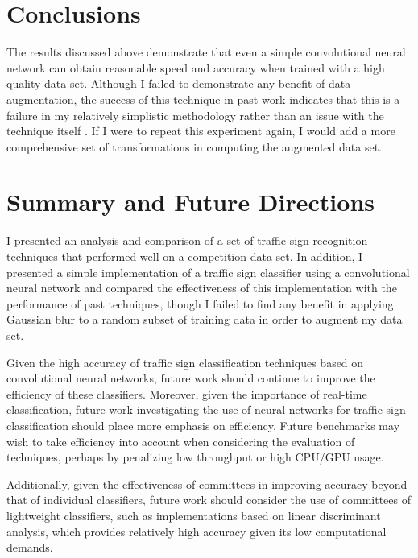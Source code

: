 \documentclass[letterpaper,twocolumn,10pt]{article}
\begin{document}
\section{Conclusions}

The results discussed above demonstrate that even a simple convolutional neural network can obtain reasonable speed and accuracy when trained with a high quality data set. Although I failed to demonstrate any benefit of data augmentation, the success of this technique in past work indicates that this is a failure in my relatively simplistic methodology rather than an issue with the technique itself \cite{ciresan_committee_2011, sermanet_convolutional_2012}. If I were to repeat this experiment again, I would add a more comprehensive set of transformations in computing the augmented data set. 

\section{Summary and Future Directions}

I presented an analysis and comparison of a set of traffic sign recognition techniques that performed well on a competition data set. In addition, I presented a simple implementation of a traffic sign classifier using a convolutional neural network and compared the effectiveness of this implementation with the performance of past techniques, though I failed to find any benefit in applying Gaussian blur to a random subset of training data in order to augment my data set.

Given the high accuracy of traffic sign classification techniques based on convolutional neural networks, future work should continue to improve the efficiency of these classifiers. Moreover, given the importance of real-time classification, future work investigating the use of neural networks for traffic sign classification should place more emphasis on efficiency. Future benchmarks may wish to take efficiency into account when considering the evaluation of techniques, perhaps by penalizing low throughput or high CPU/GPU usage.

Additionally, given the effectiveness of committees in improving accuracy beyond that of individual classifiers, future work should consider the use of committees of lightweight classifiers, such as implementations based on linear discriminant analysis, which provides relatively high accuracy given its low computational demands.

{\footnotesize 
}
\end{document}
